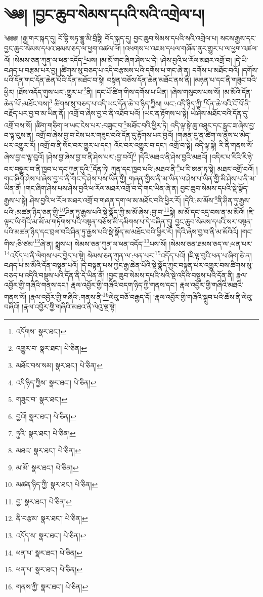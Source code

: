 \setcounter{footnote}{0} 
\chapter{༄༅། །བྱང་ཆུབ་སེམས་དཔའི་སའི་འགྲེལ་པ།}༄༅༅། །རྒྱ་གར་སྐད་དུ། བོ་དྷི་སཏྭ་བྷཱུ་མི་བྲྀཏྟི། བོད་སྐད་དུ། བྱང་ཆུབ་སེམས་དཔའི་སའི་འགྲེལ་པ། སངས་རྒྱས་དང་བྱང་ཆུབ་སེམས་དཔའ་ཐམས་ཅད་ལ་ཕྱག་འཚལ་ལོ། །འཕགས་པ་འཇམ་དཔལ་གཞོན་ནུར་གྱུར་པ་ལ་ཕྱག་འཚལ་ལོ། །སེམས་ཅན་ཀུན་ལ་ཕན་འདོད་\footnote{འདོགས་  སྣར་ཐང་། }པས། །མ་མོ་གང་ཞིག་ཤེས་པ་དེ། །ཤེས་བྱའི་ཕ་རོལ་མཐར་འགྲོ་བ། །དེ་ཡི་བཤད་པ་བརྩམ་པར་བྱ། །ཚིགས་སུ་བཅད་པ་འདི་བརྩམས་པའི་དགོས་པ་གང་ཞེ་ན། དགོས་པ་མཐོང་བའོ། །དགོས་པའི་དོན་གང་དོན་ཆེན་པོའི་དོན་མཐོང་བ་སྟེ། བསྟན་བཅོས་དོན་ཆེན་མཐོང་ནས་ནི། །མཉན་པ་དང་ནི་གཟུང་བའི་ཕྱིར། །ཐོས་འདོད་གུས་པར་:གྱུར་པ་\footnote{འགྱུར་བ་  སྣར་ཐང་།  པེ་ཅིན། }ནི། །དང་པོ་ཚིག་གིས་དགོས་པ་ཡིན། །ཞེས་གསུངས་པས་སོ། །མ་མོའི་དོན་ཆེན་པོ་:མཐོང་བས།\footnote{མཐོང་བས་སམ།  སྣར་ཐང་།  པེ་ཅིན། } ཚིགས་སུ་བཅད་པ་འདི་ཡང་དོན་ཆེ་བ་ཉིད་ཀྱིས། ཡང་:འདི་ཉིད་ཀྱི་\footnote{འདི་ཉིད་ཀྱིས་  སྣར་ཐང་།  པེ་ཅིན། }དོན་ཆེ་བའི་ངོ་བོ་ནི་བརྗོད་པར་བྱ་བ་མ་ཡིན་ནོ། །འགྲོ་བ་ཞེས་བྱ་བ་ནི་འཐོབ་པའོ། །ཡང་ན་རྟོགས་པ་སྟེ། ཡེ་ཤེས་མཐོང་བའི་དོན་དུ་འགྲོ་བས་སོ། །ཚིག་གཅིག་ལ་ཡང་ངེས་པར་:བཟུང་བ་\footnote{གཟུང་བ་  སྣར་ཐང་། }མཐོང་བའི་ཕྱིར་ཏེ། འདི་ལྟ་སྟེ་ཆུ་འཐུང་དང་རླུང་ཟ་ཞེས་བྱ་བ་ལྟ་བུས་ན། འགྲོ་བ་ཞེས་བྱ་བ་ངེས་པར་གཟུང་བའི་དོན་དུ་རྟོགས་པར་བྱའོ། །གཞན་དུ་ན་ཚིག་ལ་ནུས་པ་མེད་པར་འགྱུར་རོ། །འགྲོ་བ་ནི་སོང་བར་གྱུར་པ་དང་། འོང་བར་འགྱུར་བ་དང་། འགྲོ་བ་སྟེ། འདི་ལྟ་སྟེ། རི་ནི་གནས་སོ་ཞེས་བྱ་བ་ལྟ་བུའོ། །ཤེས་བྱ་ཞེས་བྱ་བ་ནི་ཤེས་པར་:བྱ་བའོ།\footnote{བྱའོ།  སྣར་ཐང་།  པེ་ཅིན། } །དེའི་མཐའ་ནི་ཤེས་བྱའི་མཐའོ། །འདིར་པ་རིའི་རི་ཉེ་བར་བསྒྱུར་བ་ནི་ཁྱབ་པ་དང་ཀུན་དུའི་\footnote{ཏུའི་  སྣར་ཐང་།  པེ་ཅིན། }དོན་ཏེ། ཀུན་དང་ཁྱབ་པའི་:མཐའ་ནི་\footnote{མཐའ་  སྣར་ཐང་།  པེ་ཅིན། }པ་རི་ཨན་ཏ་སྟེ། མཐར་འགྲོ་བའོ། །གང་ཞིག་ཤེས་པ་ཞེས་བྱ་བ་ནི་གང་དེ་ཤེས་པས་ཡིན་གྱི། གཞན་གྱིས་ནི་མ་ཡིན་ལ་ཤེས་པ་ཡིན་གྱི་མི་ཤེས་པ་ནི་མ་ཡིན་ནོ། །གང་ཞིག་ཤེས་པས་ཤེས་བྱའི་ཕ་རོལ་མཐར་འགྲོ་བ་དེ་གང་ཡིན་ཞེ་ན། བྱང་ཆུབ་སེམས་དཔའི་སྡེ་སྣོད་རྒྱས་པ་སྟེ། ཤེས་བྱའི་ཕ་རོལ་མཐར་འགྲོ་བ་གཞན་དག་ལ་མ་མཐོང་བའི་ཕྱིར་རོ། །དེའི་:མ་མོས་\footnote{མ་མོ་  སྣར་ཐང་།  པེ་ཅིན། }ནི་ཤིན་ཏུ་རྒྱས་པའི་:མཚན་ཉིད་ཅན་གྱི་\footnote{མཚན་ཉིད་ཀྱི་  སྣར་ཐང་།  པེ་ཅིན། }ཤིན་ཏུ་རྒྱས་པའི་སྡེ་སྣོད་ཀྱི་མ་མོ་ཞེས་:བྱ་བ་\footnote{བྱ་  སྣར་ཐང་།  པེ་ཅིན། }སྟེ། མ་མོ་དང་འདྲ་བས་ན་མ་མོའོ། །ཇི་ལྟར་ཡི་གེའི་མ་མོ་མ་གཏོགས་པའི་བསྟན་བཅོས་མི་དམིགས་པ་དེ་བཞིན་དུ། བྱང་ཆུབ་སེམས་དཔའི་སར་བསྟན་པའི་མཚན་ཉིད་དང་བྲལ་བའི་ཤིན་ཏུ་རྒྱས་པའི་སྡེ་སྣོད་མ་མཐོང་བའི་ཕྱིར་རོ། །དེའི་ཞེས་བྱ་བ་ནི་མ་མོའིའོ། །གང་གིས་:ཅི་ཙམ་\footnote{ནི་བརྩམ་  སྣར་ཐང་།  པེ་ཅིན། }ཞེ་ན། སྨྲས་པ། སེམས་ཅན་ཀུན་ལ་ཕན་འདོད་\footnote{འདོད་ས་  སྣར་ཐང་།  པེ་ཅིན། }པས་སོ། །སེམས་ཅན་ཐམས་ཅད་ལ་:ཕན་པར་\footnote{ཕན་པ་  སྣར་ཐང་།  པེ་ཅིན། }འདོད་པ་ནི་ལེགས་པར་བྱེད་པ་སྟེ། སེམས་ཅན་ཀུན་ལ་:ཕན་པར་\footnote{ཕན་པ་  སྣར་ཐང་།  པེ་ཅིན། }འདོད་པའོ། །ཇི་ལྟ་བུའི་ཕན་པ་ཞིག་ཅེ་ན། བཤད་པ་མ་མོའི་དོན་བསྟན་པའོ། །དེ་བསྟན་པས་ཀྱང་རྒྱ་ཆེན་པོའི་སྡེ་སྣོད་ཀྱང་བསྟན་པར་འགྱུར་བས་ཚིགས་སུ་བཅད་པ་འདིའི་བསྡུས་པའི་དོན་ནི་དེ་ཡིན་ནོ། །བྱང་ཆུབ་སེམས་དཔའི་སའི་སྡེ་འདིའི་བསྡུས་པའི་དོན་ནི། རྣལ་འབྱོར་གྱི་གཞིའི་གནས་དང་། རྣལ་འབྱོར་གྱི་གཞིའི་བདག་ཉིད་ཀྱི་གནས་དང་། རྣལ་འབྱོར་གྱི་གཞིའི་མཐའི་གནས་སོ། །རྣལ་འབྱོར་གྱི་གཞིའི་:གནས་ནི་\footnote{གནས་ཀྱི་  སྣར་ཐང་།  པེ་ཅིན། }ལེའུ་བཅོ་བརྒྱད་དོ། །རྣལ་འབྱོར་གྱི་གཞིའི་སྒྲུབ་པའི་ཆོས་ནི་ལེའུ་བཞིའོ། །རྣལ་འབྱོར་གྱི་གཞིའི་མཐའ་ནི་ལེའུ་ལྔ་སྟེ། 